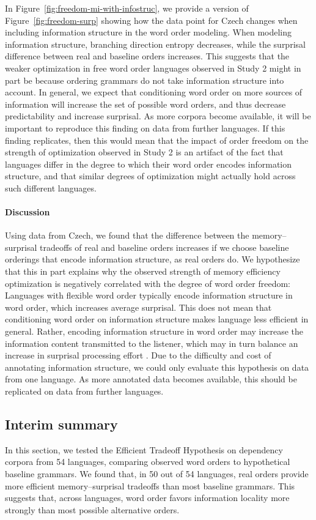 In Figure~\ref{fig:freedom-mi-with-infostruc}, we provide a version of Figure~\ref{fig:freedom-surp} showing how the data point for Czech changes when including information structure in the  word order modeling. When modeling information structure, branching direction entropy decreases, while the surprisal difference between real and baseline orders increases.
This suggests that the weaker optimization in free word order languages observed in Study 2 might in part be because ordering grammars do not take information structure into account.
In general, we expect that conditioning word order on more sources of information will increase the set of possible word orders, and thus decrease predictability and increase surprisal.
As more corpora become available, it will be important to reproduce this finding on data from further languages.
If this finding replicates, then this would mean that the impact of order freedom on the strength of optimization observed in Study 2 is an artifact of the fact that languages differ in the degree to which their word order encodes information structure, and that similar degrees of optimization might actually hold across such different languages.
	
\paragraph{Discussion}
Using data from Czech, we found that the difference between the memory--surprisal tradeoffs of real and baseline orders increases if we choose baseline orderings that encode information structure, as real orders do.
We hypothesize that this in part explains why the observed strength of memory efficiency optimization is negatively correlated with the degree of word order freedom:
Languages with flexible word order typically encode information structure in word order, which increases average surprisal.
This does not mean that conditioning word order on information structure makes language less efficient in general.
Rather, encoding information structure in word order may increase the information content transmitted to the listener, which may in turn balance an increase in surprisal processing effort \citep{hahn2020universals}.
Due to the difficulty and cost of annotating information structure, we could only evaluate this hypothesis on data from one language.
As more annotated data becomes available, this should be replicated on data from further languages.


\subsection{Interim summary}
In this section, we tested the Efficient Tradeoff Hypothesis on dependency corpora from 54 languages, comparing observed word orders to hypothetical baseline grammars.
We found that, in 50 out of 54 languages, real orders provide more efficient memory--surprisal tradeoffs than most baseline grammars.
This suggests that, across languages, word order favors information locality more strongly than most possible alternative orders.

